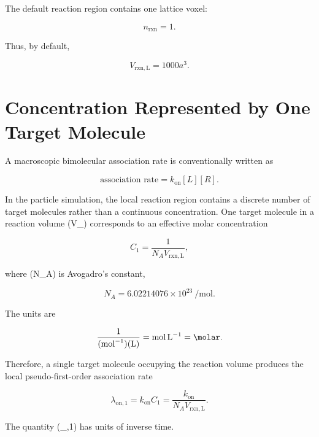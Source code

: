 \documentclass[11pt]{article}
\begin{document}
The default reaction region contains one lattice voxel:

\begin{equation}
n_{\mathrm{rxn}}=1.
\end{equation}

Thus, by default,

\begin{equation}
V_{\mathrm{rxn,L}}
=
1000a^3.
\end{equation}

\section{Concentration Represented by One Target Molecule}

A macroscopic bimolecular association rate is conventionally written as

\begin{equation}
\text{association rate}
=
k_{\mathrm{on}}[L][R].
\end{equation}

In the particle simulation, the local reaction region contains a discrete number of target molecules rather than a continuous concentration. One target molecule in a reaction volume (V_{}) corresponds to an effective molar concentration

\begin{equation}
C_1
=
\frac{1}{N_A V_{\mathrm{rxn,L}}},
\end{equation}

where (N_A) is Avogadro's constant,

\begin{equation}
N_A
=
6.02214076\times10^{23}
~\si{\per\mole}.
\end{equation}

The units are

\begin{equation}
\frac{1}
{
(\si{\per\mole})(\si{\liter})
}
=
\si{\mole\per\liter}
=
\si{\molar}.
\end{equation}

Therefore, a single target molecule occupying the reaction volume produces the local pseudo-first-order association rate

\begin{equation}
\lambda_{\mathrm{on},1}
=
k_{\mathrm{on}}C_1
=
\frac{k_{\mathrm{on}}}
{N_A V_{\mathrm{rxn,L}}}.
\end{equation}

The quantity (\lambda_{,1}) has units of inverse time.
\end{document}
